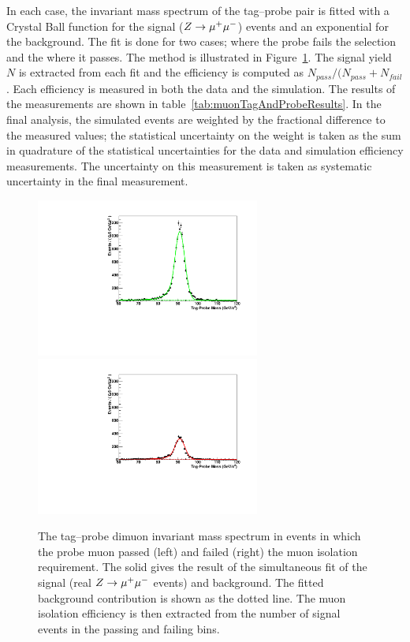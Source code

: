 In each case, the invariant mass spectrum of the tag--probe pair is fitted with
a Crystal Ball function for the signal ($Z\to\mu^+\mu^-$) events and an
exponential for the background.  The fit is done for two cases; where the probe
fails the selection and the where it passes.  The method is illustrated in
Figure~\ref{fig:TagAndProbeFits}.  The signal yield $N$ is extracted from each
fit and the efficiency is computed as $N_{pass}/(N_{pass} + N_{fail}$.  Each
efficiency is measured in both the data and the simulation. The results of the
measurements are shown in table~\ref{tab:muonTagAndProbeResults}. In the final
analysis, the simulated events are weighted by the fractional difference to the
measured values; the statistical uncertainty on the weight is taken as the sum
in quadrature of the statistical uncertainties for the data and simulation
efficiency measurements.  The uncertainty on this measurement is taken as
systematic uncertainty in the final measurement.
\begin{figure}[t]
\begin{center}
\includegraphics*[height=52mm]{corrections_chapter/tag_probe_data/plot_0.pdf}
\includegraphics*[height=52mm]{corrections_chapter/tag_probe_data/plot_1.pdf}
\caption[Tag--probe muon isolation method]{The tag--probe dimuon invariant mass
spectrum in events in which the probe muon passed (left) and failed (right) the
muon isolation requirement.  The solid gives the result of the simultaneous fit
of the signal (real $Z\to\mu^+\mu^-$ events) and background.  The fitted background
contribution is shown as the dotted line.  The muon isolation efficiency is then
extracted from the number of signal events in the passing and failing bins.}
\label{fig:TagAndProbeFits}
\end{center}
\end{figure} 

